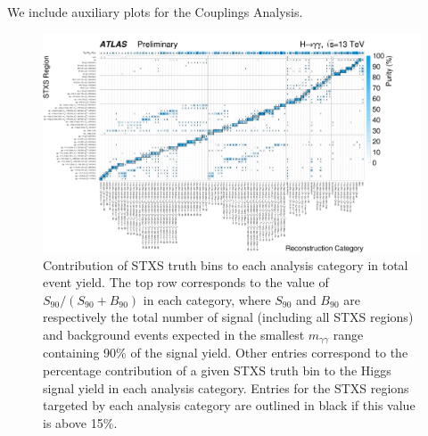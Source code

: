 

We include auxiliary plots for the Couplings Analysis.


\begin{landscape}
\begin{figure}[h]
\centering
\includegraphics[width=1.5\textwidth]{figures/couplings_chapter/purity_2D.pdf}
\caption{Contribution of STXS truth bins to each analysis category in total event yield. The top row corresponds to the value of $S_{90}/(S_{90} + B_{90})$ in each category, where $S_{90}$ and $B_{90}$ are respectively the total number of signal (including all STXS regions) and background events expected in the smallest $m_{\gamma \gamma}$ range containing 90\% of the signal yield. Other entries correspond to the percentage contribution of a given STXS truth bin to the Higgs signal yield in each analysis category. Entries for the STXS regions targeted by each analysis category are outlined in black if this value is above 15\%. }
\label{fig:design:yields}
\end{figure}
\end{landscape}

